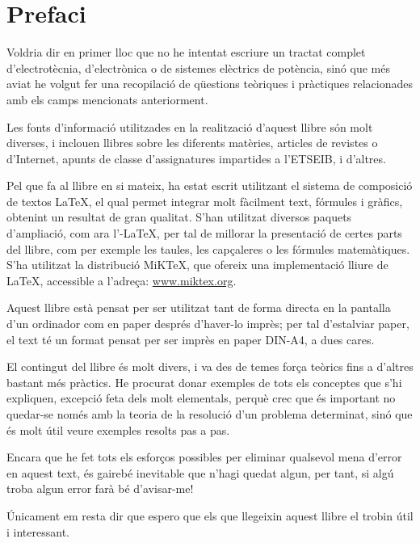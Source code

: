 \chapter*{Prefaci} 

   Voldria dir en primer lloc que no he intentat escriure un tractat complet
   d'electrotècnia, d'electrònica o de sistemes elèctrics de potència, sinó que més aviat
   he volgut
   fer una recopilació de qüestions teòriques i pràctiques relacionades amb els camps mencionats
   anteriorment.

   Les fonts d'informació utilitzades en la realització d'aquest llibre són molt diverses,
   i inclouen llibres sobre les diferents matèries, articles de revistes o d'Internet,
   apunts de classe d'assignatures impartides a l'ETSEIB, i d'altres.

   Pel que fa al llibre en si mateix, ha estat escrit utilitzant el sistema de composició de
   textos \LaTeX, el qual
   permet integrar molt fàcilment text, fórmules i gràfics, obtenint un resultat de
   gran qualitat. S'han utilitzat diversos paquets d'ampliació, com ara
   l'\AmS-\LaTeX,
   per tal de millorar la presentació de certes parts del
   llibre, com per exemple les taules, les capçaleres o les fórmules matemàtiques. S'ha utilitzat la distribució MiK\TeX, que ofereix una implementació lliure de \LaTeX , accessible a l'adreça: \href{http://www.miktex.org/}{www.miktex.org}.

   Aquest llibre està pensat per ser utilitzat tant de forma directa en la pantalla d'un
   ordinador com en paper després d'haver-lo imprès; per tal d'estalviar paper, el text
   té un format pensat per ser imprès en paper DIN-A4, a dues cares.

    El contingut del llibre és molt divers, i va des de temes força teòrics fins a
    d'altres bastant més pràctics. He procurat donar exemples de tots els conceptes
    que s'hi expliquen, excepció feta dels molt elementals, perquè crec que és important
     no quedar-se només amb la teoria de  la resolució d'un problema determinat, sinó que
     és molt útil veure exemples resolts pas a pas.

    Encara que he fet tots els esforços possibles per eliminar qualsevol
    mena  d'error en aquest text, és gairebé inevitable que n'hagi quedat algun,
    per tant, si algú troba algun error farà bé d'avisar-me!


   Únicament em resta dir que espero que els que llegeixin aquest llibre el trobin
   útil i interessant.


